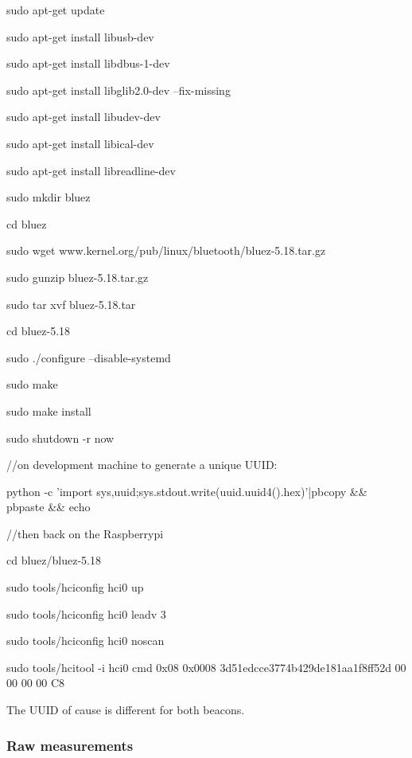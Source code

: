 sudo apt-get update

sudo apt-get install libusb-dev 

sudo apt-get install libdbus-1-dev 

sudo apt-get install libglib2.0-dev --fix-missing

sudo apt-get install libudev-dev 

sudo apt-get install libical-dev

sudo apt-get install libreadline-dev

sudo mkdir bluez

cd bluez

sudo wget www.kernel.org/pub/linux/bluetooth/bluez-5.18.tar.gz

sudo gunzip bluez-5.18.tar.gz

sudo tar xvf bluez-5.18.tar

cd bluez-5.18

sudo ./configure --disable-systemd

sudo make

sudo make install

sudo shutdown -r now

//on development  machine to generate a unique UUID:

python -c 'import sys,uuid;sys.stdout.write(uuid.uuid4().hex)'|pbcopy \&\& pbpaste \&\& echo


//then back on the Raspberrypi

cd bluez/bluez-5.18

sudo tools/hciconfig hci0 up

sudo tools/hciconfig hci0 leadv 3

sudo tools/hciconfig hci0 noscan

sudo tools/hcitool -i hci0 cmd 0x08 0x0008 3d51edcce3774b429de181aa1f8ff52d 00 00 00 00 C8

The UUID of cause is different for both beacons.

\subsubsection{Raw measurements}

